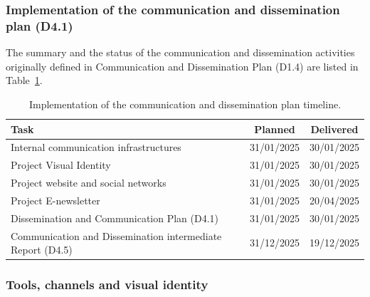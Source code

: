 \documentclass[a4paper,12pt, numbers]{article}
\begin{document}
\subsubsection*{Implementation of the communication and dissemination plan (D4.1)}
The summary and the status of the communication and dissemination activities originally defined in Communication and Dissemination Plan (D1.4) are listed in Table~\ref{tab:commdiss}.

\begin{table}[htbp]
\centering
\caption{Implementation of the communication and dissemination plan timeline.}\label{tab:commdiss}
\medskip
\renewcommand{\arraystretch}{1.2}
\begin{tabular}{p{9cm}cc} %
\toprule
\textbf{Task} & \textbf{Planned} & \textbf{Delivered} \\
\midrule
Internal communication infrastructures & 31/01/2025 & 30/01/2025 \\
\midrule
Project Visual Identity & 31/01/2025 & 30/01/2025  \\
\midrule
Project website and social networks & 31/01/2025 & 30/01/2025 \\
\midrule
Project E-newsletter & 31/01/2025 & 20/04/2025 \\		\midrule
Dissemination and Communication Plan (D4.1) & 31/01/2025 & 30/01/2025 \\
\midrule
Communication and Dissemination intermediate Report (D4.5) & 31/12/2025 & 19/12/2025 \\
\bottomrule
\end{tabular}
\end{table}

\subsubsection*{Tools, channels and visual identity}
\end{document}
